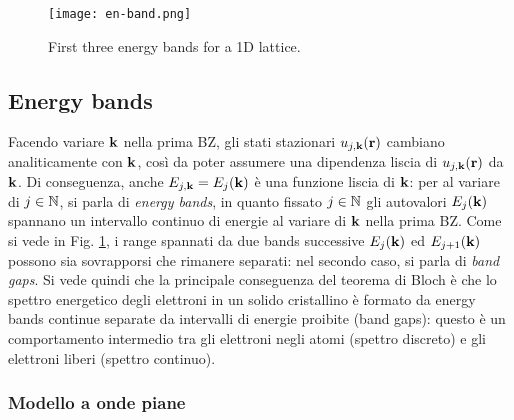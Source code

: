 \begin{figure}[!b]
	\centering
	\texttt{[image: en-band.png]}
	\caption{First three energy bands for a 1D lattice.}
	\label{en-band}
\end{figure}

\subsection{Energy bands}

Facendo variare $ \mathbf{k} $ nella prima BZ, gli stati stazionari $ u_{j,\mathbf{k}}(\mathbf{r}) $ cambiano analiticamente con $ \mathbf{k} $, così da poter assumere una dipendenza liscia di $ u_{j,\mathbf{k}}(\mathbf{r}) $ da $ \mathbf{k} $. Di conseguenza, anche $ E_{j,\mathbf{k}} = E_j(\mathbf{k}) $ è una funzione liscia di $ \mathbf{k} $: per al variare di $ j \in \mathbb{N} $, si parla di \textit{energy bands}, in quanto fissato $ j \in \mathbb{N} $ gli autovalori $ E_j(\mathbf{k}) $ spannano un intervallo continuo di energie al variare di $ \mathbf{k} $ nella prima BZ. Come si vede in Fig. \ref{en-band}, i range spannati da due bands successive $ E_j(\mathbf{k}) $ ed $ E_{j+1}(\mathbf{k}) $ possono sia sovrapporsi che rimanere separati: nel secondo caso, si parla di \textit{band gaps}. Si vede quindi che la principale conseguenza del teorema di Bloch è che lo spettro energetico degli elettroni in un solido cristallino è formato da energy bands continue separate da intervalli di energie proibite (band gaps): questo è un comportamento intermedio tra gli elettroni negli atomi (spettro discreto) e gli elettroni liberi (spettro continuo).

\subsubsection{Modello a onde piane}


